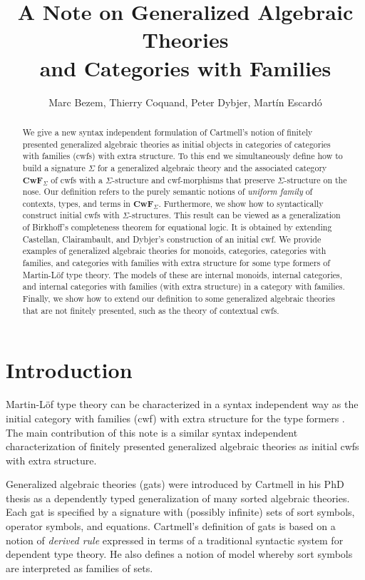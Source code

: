 \documentclass{lmcs}
\title[Generalized Algebraic Theories and Categories with Families]{A Note on Generalized Algebraic Theories\\and Categories with Families}\author{Marc Bezem, Thierry Coquand, Peter Dybjer, Mart\'in Escard\'o}
\def\Cwf{\mathbf{CwF}}
\begin{document}
\maketitle

\begin{abstract}
We give a new syntax independent formulation of Cartmell's notion of finitely presented generalized algebraic theories as initial objects in categories of categories with families (cwfs) with extra structure.
To this end we simultaneously define how to build a signature $\Sigma$ for a generalized algebraic theory and the associated category $\Cwf_\Sigma$ of cwfs with a $\Sigma$-structure and cwf-morphisms that preserve $\Sigma$-structure on the nose.  Our definition refers to the purely semantic notions of {\em uniform family} of contexts, types, and terms in $\Cwf_\Sigma$. Furthermore, we show how to syntactically construct initial cwfs with $\Sigma$-structures. This result can be viewed as a generalization of Birkhoff's completeness theorem for equational logic. It is obtained by extending Castellan, Clairambault, and Dybjer's construction of an initial cwf. We provide examples of generalized algebraic theories for monoids, categories, categories with families, and categories with families with extra structure for some type formers of Martin-Löf type theory. The models of these are internal monoids, internal categories, and internal categories with families (with extra structure) in a category with families. Finally, we show how to extend our definition to some generalized algebraic theories that are not finitely presented, such as the theory of contextual cwfs.
\end{abstract}

\section{Introduction}

Martin-Löf type theory can be characterized in a syntax independent way as the initial category with families (cwf)  with extra structure for the type formers \cite{castellan:tlca2015,castellan:lmcs}. The main contribution of this note is a similar syntax independent characterization of finitely presented generalized algebraic theories as initial cwfs with extra structure.

Generalized algebraic theories (gats) were introduced by Cartmell in his PhD thesis \cite{cartmell:phd} as a dependently typed generalization of many sorted algebraic theories. Each gat is specified by a signature with (possibly infinite) sets of sort symbols, operator symbols, and equations. Cartmell's definition of gats \cite{cartmell:phd,cartmell:apal} is based on a notion of {\em derived rule} expressed in terms of a traditional syntactic system for dependent type theory. He also defines a notion of model whereby sort symbols are interpreted as families of sets.
\end{document}
